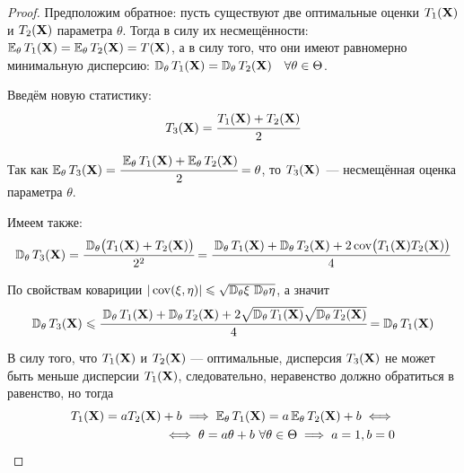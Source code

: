 \begin{proof}
    Предположим обратное: пусть существуют две оптимальные оценки $T_1(\mathbf{X})$ и $T_2(\mathbf{X})$ параметра $\theta$. 
    Тогда в силу их несмещённости: $\operatorname{\operatorname{\mathbb{E}}_{\theta}}  T_{1}(\mathbf{X}) = \operatorname{\operatorname{\mathbb{E}}_{\theta}} T_{2}(\mathbf{X}) = T(\mathbf{X})$,
    а в силу того, что они имеют равномерно минимальную дисперсию: $\operatorname{\mathbb{D}_{\theta}}  T_{1}(\mathbf{X})=\operatorname{\mathbb{D}_{\theta}}  T_{2}(\mathbf{X}) \quad \forall \theta \in \Theta$.

    Введём новую статистику: 
    \begin{equation*}
        T_{3}(\mathbf{X})=\cfrac{T_{1}(\mathbf{X})+T_{2}(\mathbf{X})}{2}
    \end{equation*}

    Так как $\operatorname{\operatorname{\mathbb{E}}_{\theta}}  T_{3}(\mathbf{X})=\cfrac{\operatorname{\operatorname{\mathbb{E}}_{\theta}}  T_{1}(\mathbf{X})+\operatorname{\operatorname{\mathbb{E}}_{\theta}}  T_{2}(\mathbf{X})}{2}=\theta$, то $T_{3}(\mathbf{X})$~--- несмещённая оценка параметра $\theta$.

    Имеем также:
    \begin{equation*}
        \operatorname{\mathbb{D}_{\theta}}  T_{3}(\mathbf{X}) = 
        \cfrac{\operatorname{\mathbb{D}_{\theta}} \bigl(T_{1}(\mathbf{X})+T_{2}(\mathbf{X})\bigr)}{2^2} =
        \cfrac{\operatorname{\mathbb{D}_{\theta}}  T_{1}(\mathbf{X})+\operatorname{\mathbb{D}_{\theta}}  T_{2}(\mathbf{X})+2 \operatorname{cov}\bigl(T_{1}(\mathbf{X}) T_{2}(\mathbf{X})\bigr)}{4}
    \end{equation*}

    По свойствам ковариции $| \operatorname{cov}(\xi, \eta)| \leqslant \sqrt{\operatorname{\mathbb{D}_{\theta}} \!\xi \, \operatorname{\mathbb{D}_{\theta}} \!\eta}$, а значит
    \begin{equation*}
        \operatorname{\mathbb{D}_{\theta}}  T_{3}(\mathbf{X}) \leqslant \cfrac{\operatorname{\mathbb{D}_{\theta}}  T_{1}(\mathbf{X})+\operatorname{\mathbb{D}_{\theta}}  T_{2}(\mathbf{X})+2 \sqrt{\operatorname{\mathbb{D}_{\theta}}  T_{1}(\mathbf{X})} \sqrt{\operatorname{\mathbb{D}_{\theta}}  T_{2}(\mathbf{X})}}{4} =\operatorname{\mathbb{D}_{\theta}}  T_{1}(\mathbf{X})
    \end{equation*}

    В силу того, что $T_1(\mathbf{X})$ и $T_2(\mathbf{X})$ — оптимальные, дисперсия $T_3(\mathbf{X})$ не может быть меньше дисперсии $T_1(\mathbf{X})$, 
    следовательно, неравенство должно обратиться в равенство, но тогда
    \begin{equation*}
    \begin{aligned}
        T_{1}(\mathbf{X})=a T_{2}(\mathbf{X})+b \implies \operatorname{\operatorname{\mathbb{E}}_{\theta}}  T_{1}(\mathbf{X})
        = a \operatorname{\operatorname{\mathbb{E}}_{\theta}}  T_{2}(\mathbf{X})+b 
        \iff \\
        \iff \theta = a \theta + b~ \forall \theta \in \Theta \implies a = 1, b = 0
    \end{aligned}
    \end{equation*}
\end{proof}
